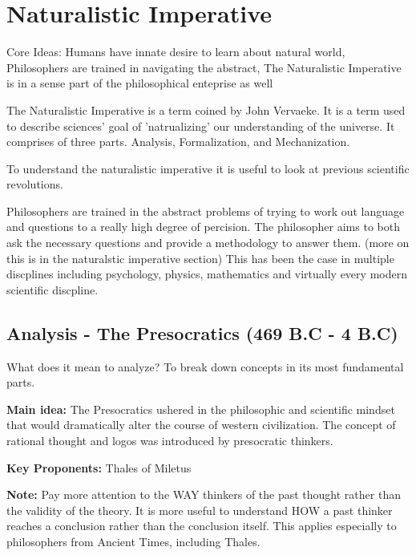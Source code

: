 \documentclass[twoside]{article}
\begin{document}
\section{Naturalistic Imperative}
Core Ideas: Humans have innate desire to learn about natural world, Philosophers
are trained in navigating the abstract, The Naturalistic Imperative is in a
sense part of the philosophical enteprise as well

The Naturalistic Imperative is a term coined by John Vervaeke. It is a term used
to describe sciences' goal of 'natrualizing' our understanding of the
universe. It comprises of three parts. Analysis, Formalization, and Mechanization.

To understand the naturalistic imperative it is useful to look at previous scientific revolutions.

Philosophers are trained in the abstract problems of trying to work out
language and questions to a really high degree of percision. The philosopher aims
to both ask the necessary questions and provide a methodology to answer them. (more
on this is in the naturalstic imperative section) This has been the case in multiple
discplines including psychology, physics, mathematics and virtually every modern
scientific discpline.

\subsection{Analysis - The Presocratics (469 B.C - 4 B.C)}
What does it mean to analyze? To break down concepts in its most fundamental
parts.

\textbf{Main idea:} The Presocratics ushered in the philosophic and scientific
mindset that would dramatically alter the course of western civilization. The concept
of rational thought and logos was introduced by presocratic thinkers.

\textbf{Key Proponents: } Thales of Miletus

\textbf{Note:} Pay more attention to the WAY thinkers of the past thought
rather than the validity of the theory. It is more useful to understand HOW a past
thinker reaches a conclusion rather than the conclusion itself. This applies especially
to philosophers from Ancient Times, including Thales.

\end{document}
